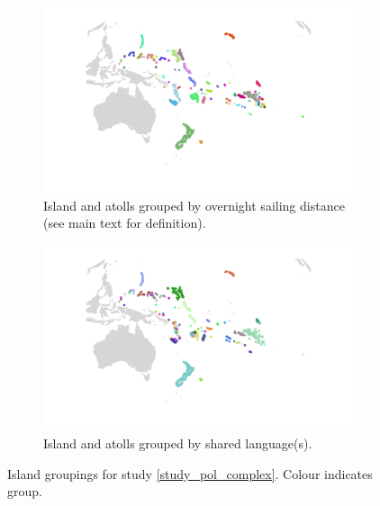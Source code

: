 \documentclass[a4paper,10pt]{article} %
\begin{document}

\begin{figure}[ht]
\centering
    \begin{subfigure}{\textwidth}
    \includegraphics[width=\textwidth]{illustrations/plots_from_R/polygon_marck_group_map.png}
     \caption{Island and atolls grouped by overnight sailing distance (see main text for definition).}
\label{marck_group_map}
    \end{subfigure}

    \begin{subfigure}{\textwidth}
\includegraphics[width=\textwidth]{illustrations/plots_from_R/polygon_medium_group_map.png}
\caption{Island and atolls grouped by shared language(s).}
\label{medium_group_map}
    \end{subfigure}
\caption{{Island groupings for study \ref{study_pol_complex}. Colour indicates group.}}
    \label{fig:island_groups}
    \end{figure}
    
\end{document}

